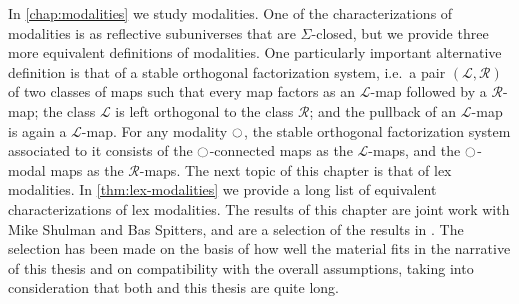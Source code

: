 In \cref{chap:modalities} we study modalities. One of the characterizations of modalities is as reflective subuniverses that are $\Sigma$-closed, but we provide three more equivalent definitions of modalities. One particularly important alternative definition is that of a stable orthogonal factorization system, i.e.~a pair $(\mathcal{L},\mathcal{R})$ of two classes of maps such that every map factors as an $\mathcal{L}$-map followed by a $\mathcal{R}$-map; the class $\mathcal{L}$ is left orthogonal to the class $\mathcal{R}$; and the pullback of an $\mathcal{L}$-map is again a $\mathcal{L}$-map. For any modality ${\ocircle}$, the stable orthogonal factorization system associated to it consists of the ${\ocircle}$-connected maps as the $\mathcal{L}$-maps, and the ${\ocircle}$-modal maps as the $\mathcal{R}$-maps. The next topic of this chapter is that of lex modalities. In \cref{thm:lex-modalities} we provide a long list of equivalent characterizations of lex modalities. The results of this chapter are joint work with Mike Shulman and Bas Spitters, and are a selection of the results in \cite{RijkeShulmanSpitters}. The selection has been made on the basis of how well the material fits in the narrative of this thesis and on compatibility with the overall assumptions, taking into consideration that both \cite{RijkeShulmanSpitters} and this thesis are quite long.

